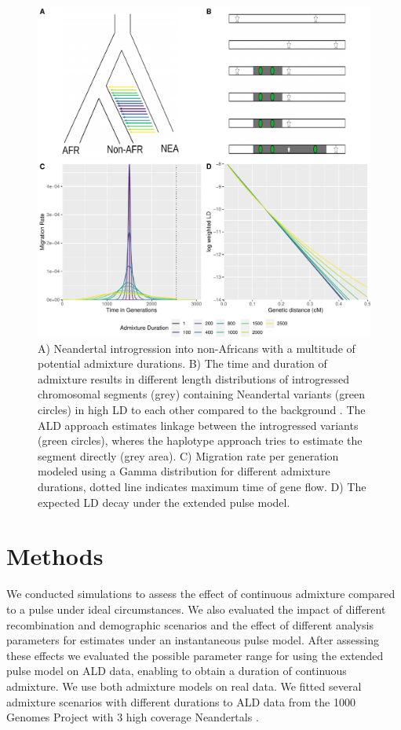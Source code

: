 \documentclass[]{article}
\begin{document}
\begin{figure}
\centering
\includegraphics{Admixture_Time_Inference_Paper_Draft_files/figure-latex/fig1-1.pdf}
\caption{\label{fig:fig1} A) Neandertal introgression into non-Africans with a multitude of potential admixture durations. B) The time and duration of admixture results in different length distributions of introgressed chromosomal segments (grey) containing  Neandertal variants (green circles)  in high LD to each other
compared to the background . The ALD approach estimates linkage
between the introgressed variants (green circles), wheres the haplotype approach tries
to estimate the segment directly (grey area). C) Migration rate per generation
modeled using a Gamma distribution for different admixture durations,
dotted line indicates maximum time of gene flow. D) The expected LD
decay under the extended pulse model.}
\end{figure}

\section{Methods}\label{methods}

We conducted simulations to assess the effect of continuous
admixture compared to a pulse under ideal circumstances. 
We also evaluated the impact of different recombination and demographic scenarios and the effect of different analysis parameters for estimates under an instantaneous pulse model.
After assessing these effects we evaluated the possible
parameter range for using the extended pulse model on ALD data,
enabling to obtain a duration of continuous admixture. We use both admixture models on real data. We fitted several admixture scenarios with different durations to ALD data from the 1000 Genomes Project \citep{the_1000_genomes_project_consortium_global_2015} with 3 high coverage Neandertals \citep{prufer_complete_2013,prufer_high-coverage_2017,mafessoni_high_coverage_2020}.
\end{document}
